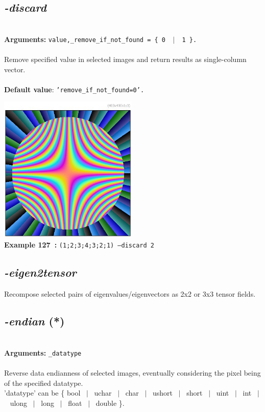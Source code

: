 \documentclass[a4paper,11pt,twoside]{book}
\begin{document}
\subsection{\emph{-discard} }\vspace*{-0.5em}
~\\\textbf{Arguments: } 
{\small \texttt{value,\_remove\_if\_not\_found = \{ 0 ~$|$~ 1 \}.}}\\~\\
Remove specified value in selected images and return results as single-column vector.
~\\~\\\textbf{Default value}: {\small \texttt{'remove\_if\_not\_found=0'.}}
\begin{center}\includegraphics[keepaspectratio=true,height=7cm,width=\textwidth]{img/gmic_def127.jpg}\\
{\footnotesize \textbf{Example 127~:} \texttt{(1;2;3;4;3;2;1) --discard 2}}
\end{center}

\subsection{\emph{-eigen2tensor} }\vspace*{-0.5em}
Recompose selected pairs of eigenvalues/eigenvectors as 2x2 or 3x3 tensor fields.


\subsection{\emph{-endian} (*)}\vspace*{-0.5em}
~\\\textbf{Arguments: } 
{\small \texttt{\_datatype}}\\~\\
Reverse data endianness of selected images, eventually considering the pixel being of the specified datatype.
~\\'datatype' can be \{ bool ~$|$~ uchar ~$|$~ char ~$|$~ ushort ~$|$~ short ~$|$~ uint ~$|$~ int ~$|$~ ulong ~$|$~ long ~$|$~ float ~$|$~ double \}.
\end{document}
